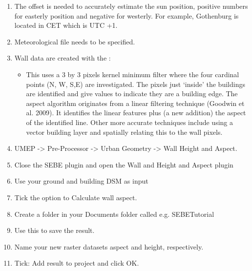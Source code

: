 \documentclass[letterpaper,10pt,english]{sphinxmanual}
\begin{document}
\begin{enumerate}
\begin{itemize}
\end{itemize}

\item {} 
The
offset is needed to accurately estimate the sun position, positive
numbers for easterly position and negative for westerly. For example,
Gothenburg is located in CET which is UTC +1.

\item {} 
Meteorological file needs to be specified.

\item {} 
Wall data are created with the {\hyperref[\detokenize{pre-processor/Urban Geometry Wall Height and Aspect:wallheightandaspect}]{}}:
\begin{itemize}
\item {} 
This uses a 3 by 3 pixels kernel minimum filter where the four
cardinal points (N, W, S,E) are investigated. The pixels just
‘inside’ the buildings are identified and give values to indicate
they are a building edge. The aspect algorithm originates from a
linear filtering technique (Goodwin et al. 2009). It identifies
the linear features plus (a new addition) the aspect of the
identified line. Other more accurate techniques include using a
vector building layer and spatially relating this to the wall
pixels.

\end{itemize}

\item {} 
UMEP -\textgreater{} Pre-Processor -\textgreater{} Urban Geometry -\textgreater{} Wall Height and Aspect.

\item {} 
Close the SEBE plugin and open the Wall and Height and Aspect plugin

\item {} 
Use your ground and building DSM as input

\item {} 
Tick the option to Calculate wall aspect.

\item {} 
Create a folder in your Documents folder called e.g. SEBETutorial

\item {} 
Use this to save the result.

\item {} 
Name your new raster datasets aspect and height, respectively.

\item {} 
Tick: Add result to project and click OK.

\end{enumerate}
\end{document}
